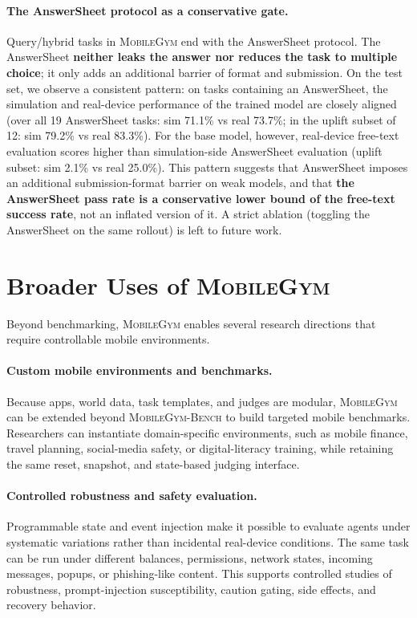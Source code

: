 \documentclass{llmxive}
\providecommand{\sys}{\textsc{MobileGym}}
\providecommand{\bench}{\textsc{MobileGym-Bench}}
\begin{document}
\paragraph{The AnswerSheet protocol as a conservative gate.} Query/hybrid tasks in \sys{} end with the AnswerSheet protocol. The AnswerSheet \textbf{neither leaks the answer nor reduces the task to multiple choice}; it only adds an additional barrier of format and submission. On the test set, we observe a consistent pattern: on tasks containing an AnswerSheet, the simulation and real-device performance of the trained model are closely aligned (over all 19 AnswerSheet tasks: sim 71.1\% vs real 73.7\%; in the uplift subset of 12: sim 79.2\% vs real 83.3\%). For the base model, however, real-device free-text evaluation scores higher than simulation-side AnswerSheet evaluation (uplift subset: sim 2.1\% vs real 25.0\%). This pattern suggests that AnswerSheet imposes an additional submission-format barrier on weak models, and that \textbf{the AnswerSheet pass rate is a conservative lower bound of the free-text success rate}, not an inflated version of it. A strict ablation (toggling the AnswerSheet on the same rollout) is left to future work.


\section{Broader Uses of \sys{}}\label{app:broader-uses}

Beyond benchmarking, \sys{} enables several research directions that require controllable mobile environments.

\paragraph{Custom mobile environments and benchmarks.} Because apps, world data, task templates, and judges are modular, \sys{} can be extended beyond \bench{} to build targeted mobile benchmarks. Researchers can instantiate domain-specific environments, such as mobile finance, travel planning, social-media safety, or digital-literacy training, while retaining the same reset, snapshot, and state-based judging interface.

\paragraph{Controlled robustness and safety evaluation.} Programmable state and event injection make it possible to evaluate agents under systematic variations rather than incidental real-device conditions. The same task can be run under different balances, permissions, network states, incoming messages, popups, or phishing-like content. This supports controlled studies of robustness, prompt-injection susceptibility, caution gating, side effects, and recovery behavior.
\end{document}
